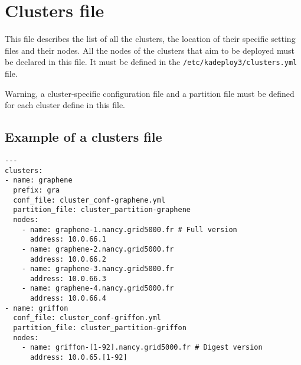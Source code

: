 \documentclass[a4wide,10pt,oneside]{book}
\begin{document}
\section{Clusters file}
This file describes the list of all the clusters, the location of their specific setting files and their nodes. All the nodes of the clusters that aim to be deployed must be declared in this file. It must be defined in the  \texttt{/etc/kadeploy3/clusters.yml} file.

Warning, a cluster-specific configuration file and a partition file must be defined for each cluster define in this file.

\subsection{Example of a clusters file\\}
\begin{small}
\begin{verbatim}
--- 
clusters:
- name: graphene
  prefix: gra
  conf_file: cluster_conf-graphene.yml
  partition_file: cluster_partition-graphene
  nodes: 
    - name: graphene-1.nancy.grid5000.fr # Full version
      address: 10.0.66.1
    - name: graphene-2.nancy.grid5000.fr
      address: 10.0.66.2
    - name: graphene-3.nancy.grid5000.fr
      address: 10.0.66.3
    - name: graphene-4.nancy.grid5000.fr
      address: 10.0.66.4
- name: griffon
  conf_file: cluster_conf-griffon.yml
  partition_file: cluster_partition-griffon
  nodes: 
    - name: griffon-[1-92].nancy.grid5000.fr # Digest version
      address: 10.0.65.[1-92]
\end{verbatim}
\end{small}
\end{document}
